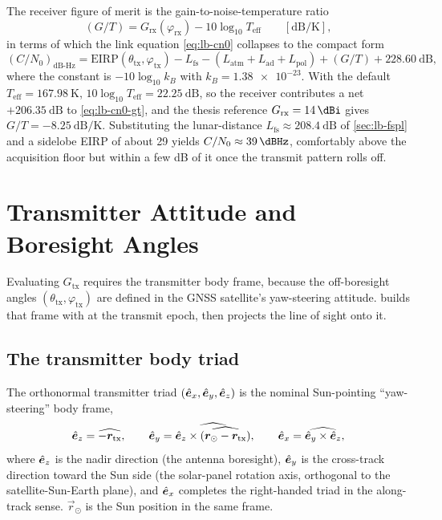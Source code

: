 The receiver figure of merit is the gain-to-noise-temperature ratio
\begin{equation}
  \left(G/T\right)
  =
  G_\mathrm{rx}(\varphi_\mathrm{rx})
  - 10\log_{10} T_\mathrm{eff}
  \qquad [\si{\dB\per\kelvin}],
  \label{eq:lb-gt}
\end{equation}
in terms of which the link equation \eqref{eq:lb-cn0} collapses to the compact
form
\begin{equation}
  \left(C/N_0\right)_{\mathrm{dB\text{-}Hz}}
  =
  \mathrm{EIRP}(\theta_\mathrm{tx}, \varphi_\mathrm{tx})
  - L_\mathrm{fs}
  - \left(L_\mathrm{atm} + L_\mathrm{ad} + L_\mathrm{pol}\right)
  + \left(G/T\right)
  + \SI{228.60}{\dB},
  \label{eq:lb-cn0-gt}
\end{equation}
where the constant is $-10\log_{10} k_B$ with $k_B = \num{1.38e-23}$.  With the
default $T_\mathrm{eff} = \SI{167.98}{\kelvin}$,
$10\log_{10} T_\mathrm{eff} = \SI{22.25}{\dB}$, so the receiver contributes a
net $+\SI{206.35}{\dB}$ to \cref{eq:lb-cn0-gt}, and the thesis reference
$G_\mathrm{rx} = \SI{14}{\dBi}$ gives
$G/T = \SI{-8.25}{\dB\per\kelvin}$.  Substituting the lunar-distance
$L_\mathrm{fs} \approx \SI{208.4}{\dB}$ of \cref{sec:lb-fspl} and a sidelobe
EIRP of about \SI{29}{\dBW} yields
$C/N_0 \approx \SI{39}{\dBHz}$, comfortably above the acquisition floor but
within a few \si{\dB} of it once the transmit pattern rolls off.

\section{Transmitter Attitude and Boresight Angles}
\label{sec:lb-attitude}

Evaluating $G_\mathrm{tx}$ requires the transmitter body frame, because the
off-boresight angles $(\theta_\mathrm{tx}, \varphi_\mathrm{tx})$ are defined in
the GNSS satellite's yaw-steering attitude.  
builds that frame with  at the transmit epoch, then projects
the line of sight onto it.

\subsection{The transmitter body triad}
\label{sec:lb-triad}

The orthonormal transmitter triad
$(\hat{\bm{e}}_x, \hat{\bm{e}}_y, \hat{\bm{e}}_z)$ is the nominal Sun-pointing
``yaw-steering'' body frame,
\begin{equation}
  \hat{\bm{e}}_z = \widehat{-\bm{r}_\mathrm{tx}},
  \qquad
  \hat{\bm{e}}_y
  = \widehat{\hat{\bm{e}}_z \times
             \widehat{\left(\bm{r}_\odot - \bm{r}_\mathrm{tx}\right)}},
  \qquad
  \hat{\bm{e}}_x = \widehat{\hat{\bm{e}}_y \times \hat{\bm{e}}_z},
  \label{eq:lb-triad}
\end{equation}
where $\hat{\bm{e}}_z$ is the nadir direction (the antenna boresight),
$\hat{\bm{e}}_y$ is the cross-track direction toward the Sun side (the solar-panel
rotation axis, orthogonal to the satellite-Sun-Earth plane), and
$\hat{\bm{e}}_x$ completes the right-handed triad in the along-track sense.
$\vec{r}_\odot$ is the Sun position in the same frame.

